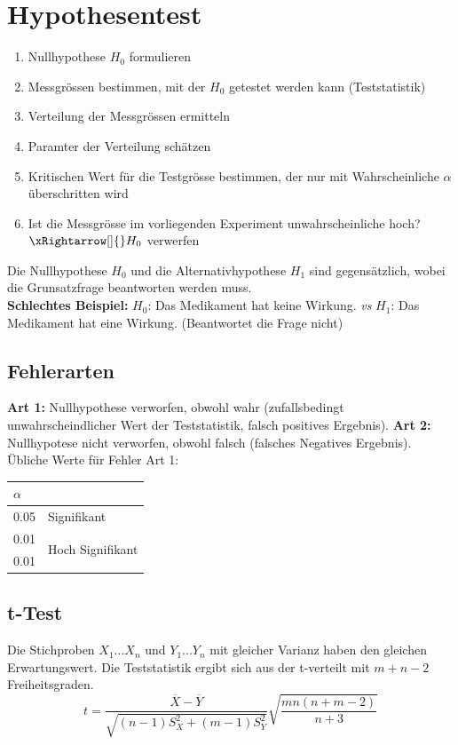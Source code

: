 \section{Hypothesentest}\label{nullhypothese}
\begin{enumerate}[nosep]
	\item Nullhypothese $H_0$ formulieren
	\item Messgrössen bestimmen, mit der $H_0$ getestet werden kann (Teststatistik)
	\item Verteilung der Messgrössen ermitteln
	\item Paramter der Verteilung schätzen
	\item Kritischen Wert für die Testgrösse bestimmen, der nur mit Wahrscheinliche $\alpha$ überschritten wird
	\item Ist die Messgrösse im vorliegenden Experiment unwahrscheinliche hoch? $\xRightarrow[]{} H_0$ verwerfen
\end{enumerate}

Die Nullhypothese $H_0$ und die Alternativhypothese $H_1$ sind gegensätzlich, wobei die Grunsatzfrage beantworten werden muss. \\
\textbf{Schlechtes Beispiel:} $H_0$: Das Medikament hat keine Wirkung. \textit{vs} $H_1$: Das Medikament hat eine Wirkung. (Beantwortet die Frage nicht)

\subsection{Fehlerarten}
\textbf{Art 1:} Nullhypothese verworfen, obwohl wahr (zufallsbedingt unwahrscheindlicher Wert der Teststatistik, falsch positives Ergebnis). \textbf{Art 2:} Nullhypotese nicht verworfen, obwohl falsch (falsches Negatives Ergebnis). Übliche Werte für Fehler Art 1:
\begin{center} 
	\begin{tabular}{ll}
	$\alpha$ & \\ \hline
	0.05 & Signifikant \\ \hline
	0.01 & \multirow{2}{*}{Hoch Signifikant} \\
	0.01 &  \\ \hline
\end{tabular}
\end{center}

\subsection{t-Test}
Die Stichproben $X_1...X_n$ und $Y_1...Y_n$ mit gleicher Varianz haben den gleichen Erwartungswert. Die Teststatistik ergibt sich aus der t-verteilt mit $m+n-2$ Freiheitsgraden.
\[
t = \frac{\overline{X} - \overline{Y}}{\sqrt{(n -1)S^2_X + (m -1)S^2_Y}}\sqrt{\frac{mn(n+m-2)}{n+3}}
\]

